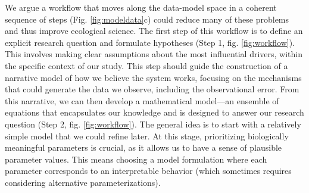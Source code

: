 \documentclass[11pt]{article}
\begin{document}

We argue a workflow that moves along the data-model space in a coherent sequence of steps %
(Fig. \ref{fig:modeldata}c) could reduce many of these problems and thus improve ecological science.
The first step of this workflow is to define an explicit research question and formulate hypotheses (Step 1, fig. \ref{fig:workflow}). This involves making clear assumptions about the most influential drivers, within the specific context of our study. This step should guide the construction of a narrative model of how we believe the system works, focusing on the mechanisms that could generate the data we observe, including the observational error. %
From this narrative, we can then develop a mathematical model---an ensemble of equations that encapsulates our knowledge and is designed to answer our research question (Step 2, fig. \ref{fig:workflow}). The general idea is to start with a relatively simple model that we could refine later. At this stage, prioritizing biologically meaningful parameters is crucial, as it allows us to have a sense of plausible parameter values. This means choosing a model formulation where each parameter corresponds to an interpretable behavior (which sometimes requires considering alternative parameterizations).
\end{document}
